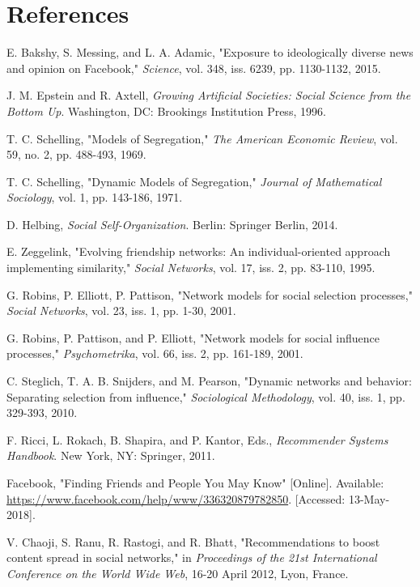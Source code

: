 \documentclass[12pt,letterpaper]{article}
\begin{document}
\section{References}
\begin{thebibliography}{}

 E. Bakshy, S. Messing, and L. A. Adamic, "Exposure to ideologically diverse news and opinion on Facebook," \textit{Science}, vol. 348, iss. 6239, pp. 1130-1132, 2015.

 J. M. Epstein and R. Axtell, \textit{Growing Artificial Societies: Social Science from the Bottom Up}. Washington, DC: Brookings Institution Press, 1996.

 T. C. Schelling, "Models of Segregation," \textit{The American Economic Review}, vol. 59, no. 2, pp. 488-493, 1969.

 T. C. Schelling, "Dynamic Models of Segregation," \textit{Journal of Mathematical Sociology}, vol. 1, pp. 143-186, 1971.

 D. Helbing, \textit{Social Self-Organization}. Berlin: Springer Berlin, 2014.

 E. Zeggelink, "Evolving friendship networks: An individual-oriented approach implementing similarity," \textit{Social Networks}, vol. 17, iss. 2, pp. 83-110, 1995.

 G. Robins, P. Elliott, P. Pattison, "Network models for social selection processes," \textit{Social Networks}, vol. 23, iss. 1, pp. 1-30, 2001.

 G. Robins, P. Pattison, and P. Elliott, "Network models for social influence processes," \textit{Psychometrika}, vol. 66, iss. 2, pp. 161-189, 2001.

 C. Steglich, T. A. B. Snijders, and M. Pearson, "Dynamic networks and behavior: Separating selection from influence," \textit{Sociological Methodology}, vol. 40, iss. 1, pp. 329-393, 2010.

 F. Ricci, L. Rokach, B. Shapira, and P. Kantor, Eds., \textit{Recommender Systems Handbook}. New York, NY: Springer, 2011.

 Facebook, "Finding Friends and People You May Know" [Online]. Available: \url{https://www.facebook.com/help/www/336320879782850}. [Accessed: 13-May-2018].

 V. Chaoji, S. Ranu, R. Rastogi, and R. Bhatt, "Recommendations to boost content spread in social networks," in \textit{Proceedings of the 21st International Conference on the World Wide Web}, 16-20 April 2012, Lyon, France.

\end{thebibliography}
\end{document}
